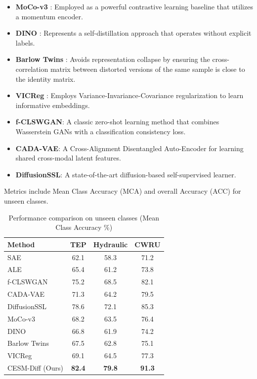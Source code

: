 \documentclass[journal]{IEEEtran}
\begin{document}
\begin{itemize}
    \item \textbf{MoCo-v3} \cite{chen2021mocov3}: Employed as a powerful contrastive learning baseline that utilizes a momentum encoder.
    \item \textbf{DINO} \cite{caron2021dino}: Represents a self-distillation approach that operates without explicit labels.
    \item \textbf{Barlow Twins} \cite{zbontar2021barlow}: Avoids representation collapse by ensuring the cross-correlation matrix between distorted versions of the same sample is close to the identity matrix.
    \item \textbf{VICReg} \cite{bardes2021vicreg}: Employs Variance-Invariance-Covariance regularization to learn informative embeddings.
    \item \textbf{f-CLSWGAN}: A classic zero-shot learning method that combines Wasserstein GANs with a classification consistency loss.
    \item \textbf{CADA-VAE}: A Cross-Alignment Disentangled Auto-Encoder for learning shared cross-modal latent features.
    \item \textbf{DiffusionSSL}: A state-of-the-art diffusion-based self-supervised learner.
\end{itemize}

Metrics include Mean Class Accuracy (MCA) and overall Accuracy (ACC) for unseen classes.

\begin{table}[htbp]
\caption{Performance comparison on unseen classes (Mean Class Accuracy \%)}
\label{tab:comparison}
\begin{center}
\begin{tabular}{lccc}
\hline
Method & TEP & Hydraulic & CWRU \\
\hline
SAE & 62.1 & 58.3 & 71.2 \\
ALE & 65.4 & 61.2 & 73.8 \\
f-CLSWGAN & 75.2 & 68.5 & 82.1 \\
CADA-VAE & 71.3 & 64.2 & 79.5 \\
DiffusionSSL & 78.6 & 72.1 & 85.3 \\
MoCo-v3 & 68.2 & 63.5 & 76.4 \\
DINO & 66.8 & 61.9 & 74.2 \\
Barlow Twins & 67.5 & 62.8 & 75.1 \\
VICReg & 69.1 & 64.5 & 77.3 \\
\hline
CESM-Diff (Ours) & \textbf{82.4} & \textbf{79.8} & \textbf{91.3} \\
\hline
\end{tabular}
\end{center}
\end{table}
\end{document}
